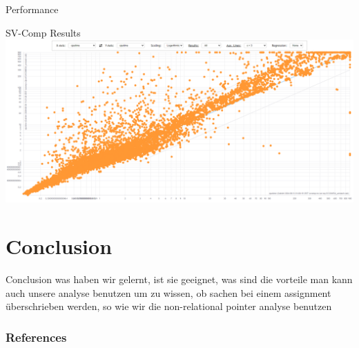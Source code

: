 \documentclass{beamer}
\begin{document}
\begin{frame}{Performance}

\end{frame}

\begin{frame}{SV-Comp Results}
    \includegraphics[scale=0.3]{images/base-vs-cpo4.png}
\end{frame}

\section{Conclusion}
\frame{\tableofcontents[currentsection]}

\begin{frame}{Conclusion}
    was haben wir gelernt, ist sie geeignet, was sind die vorteile
    man kann auch unsere analyse benutzen um zu wissen, ob sachen bei einem assignment überschrieben werden, so wie wir die non-relational pointer analyse benutzen
\end{frame}

\appendix

\begin{frame}[allowframebreaks]
    \frametitle{References}
    
    
\end{frame}
\end{document}
